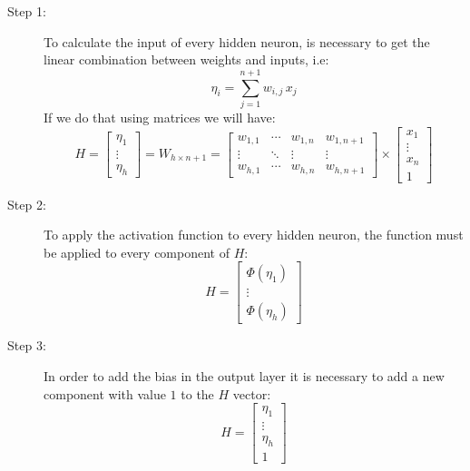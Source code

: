 \begin{description}
  \item[Step 1:]
    To calculate the input of every hidden neuron,
    is necessary to get the linear combination between weights and inputs, i.e:
    \[
      \eta_{i} = \sum_{j=1}^{n+1} w_{i,j}\,x_j
    \]
    If we do that using matrices we will have:
    \[
      H =
      \begin{bmatrix}
        \eta_1 \\
        \vdots \\
        \eta_h
      \end{bmatrix} =
        W_{h \times{n+1} } =
        \left[
          \begin{array}{ccc|c}
            w_{1, 1} & \cdots & w_{1, n} & w_{1, n+1} \\
            \vdots   & \ddots & \vdots   & \vdots     \\
            w_{h, 1} & \cdots & w_{h, n} & w_{h, n+1}
          \end{array}
        \right]
        \times
        \begin{bmatrix}
          x_1    \\
          \vdots \\
          x_n    \\
          1
        \end{bmatrix}
    \]

  \item[Step 2:]
    To apply the activation function to every hidden neuron,
    the function must be applied to every component of $H$:
    \[
      H =
      \begin{bmatrix}
        \Phi(\eta_1) \\
        \vdots       \\
        \Phi(\eta_h)
      \end{bmatrix}
    \]

  \item[Step 3:]
    In order to add the bias in the output layer
    it is necessary to add a new component
    with value $1$ to the $H$ vector:
    \[
      H =
      \begin{bmatrix}
        \eta_1 \\
        \vdots \\
        \eta_h \\
        1
      \end{bmatrix}
    \]


\end{description}
